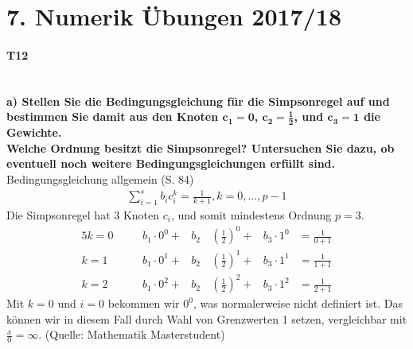\documentclass[10pt,a4paper]{article}
\begin{document}
	\section*{7. Numerik Übungen 2017/18}
	\paragraph{T12}\mbox{}\\
	\textbf{%
		a) Stellen Sie die Bedingungsgleichung für die Simpsonregel auf und bestimmen Sie damit aus den Knoten $\pmb{c_1=0}$, $\pmb{c_2=\frac{1}{2}}$, und $\pmb{c_3=1}$ die Gewichte.\\
        Welche Ordnung besitzt die Simpsonregel? Untersuchen Sie dazu, ob eventuell noch weitere Bedingungsgleichungen erfüllt sind.
	}\\
    Bedingungsgleichung allgemein (S. 84)
	\begin{align}\tag{4.31}
		\sum_{i=1}^{s}b_ic_i^k = \frac{1}{k+1}, k=0, \dots, p-1
	\end{align}
	Die Simpsonregel hat 3 Knoten $c_i$, und somit mindestens Ordnung $p = 3$.
	\begin{alignat*}{5}
		k=0 & \quad & b_1\cdot 0^0+ & b_2 \, & \left(\frac{1}{2}\right)^0+ & b_3\cdot1^0 & = \frac{1}{0+1} \\
		k=1 & \quad & b_1\cdot 0^1+ & b_2 \, & \left(\frac{1}{2}\right)^1+ & b_3\cdot1^1 & = \frac{1}{1+1} \\
		k=2 & \quad & b_1\cdot 0^2+ & b_2 \, & \left(\frac{1}{2}\right)^2+ & b_3\cdot1^2 & = \frac{1}{2+1}
		\end{alignat*}
		Mit $k=0$ und $i=0$ bekommen wir $0^0$, was normalerweise nicht definiert ist. Das können wir in diesem Fall durch Wahl von Grenzwerten 1 setzen, vergleichbar mit $\frac{x}{0}=\infty$. (Quelle: Mathematik Masterstudent)
\end{document}

